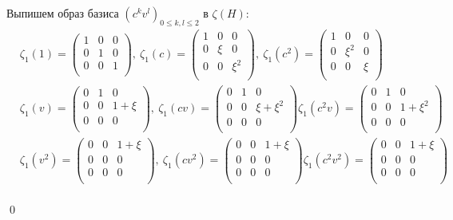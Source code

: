 \documentclass[12pt, reqno, a4paper, oneside, notitlepage]{amsart}
\makeatletter
\theoremstyle{mytheoremstyle}
\theoremstyle{myremarkstyle}
\numberwithin{equation}{section}
\renewenvironment{proof}[1][\proofname]{\par\indent {\bfseries #1\@addpunct{.} }}{\qed}
\makeatother
\begin{document}
\begin{proof}
    Выпишем образ базиса $(c^kv^l)_{0 \leq k,l \leq 2}$ в $\zeta(H)$:
    \begin{eqnarray*}
    &\zeta_1(1) = \begin{pmatrix}
    1 & 0 & 0\\
    0 & 1 & 0\\
    0 & 0 & 1\\
    \end{pmatrix},\
    \zeta_1(c) = \begin{pmatrix}
    1 & 0 & 0\\
    0 & \xi & 0\\
    0 & 0 & \xi^2\\
    \end{pmatrix},\
    \zeta_1(c^2) = \begin{pmatrix}
    1 & 0 & 0\\
    0 & \xi^2 & 0\\
    0 & 0 & \xi\\
    \end{pmatrix}\\
    &\zeta_1(v) = \begin{pmatrix}
    0 & 1 & 0\\
    0 & 0 & 1+\xi\\
    0 & 0 & 0\\
    \end{pmatrix},\
    \zeta_1(cv) = \begin{pmatrix}
    0 & 1 & 0\\
    0 & 0 & \xi+\xi^2\\
    0 & 0 & 0\\
    \end{pmatrix} 
    \zeta_1(c^2v) = \begin{pmatrix}
    0 & 1 & 0\\
    0 & 0 & 1+\xi^2\\
    0 & 0 & 0\\
    \end{pmatrix}\\
    &\zeta_1(v^2) = \begin{pmatrix}
    0 & 0 & 1+\xi\\
    0 & 0 & 0\\
    0 & 0 & 0\\
    \end{pmatrix},\
    \zeta_1(cv^2) = \begin{pmatrix}
    0 & 0 & 1+\xi\\
    0 & 0 & 0\\
    0 & 0 & 0\\
    \end{pmatrix} 
    \zeta_1(c^2v^2) = \begin{pmatrix}
    0 & 0 & 1+\xi\\
    0 & 0 & 0\\
    0 & 0 & 0\\
    \end{pmatrix}\\    
    \end{eqnarray*}


\end{proof}
\end{document}
